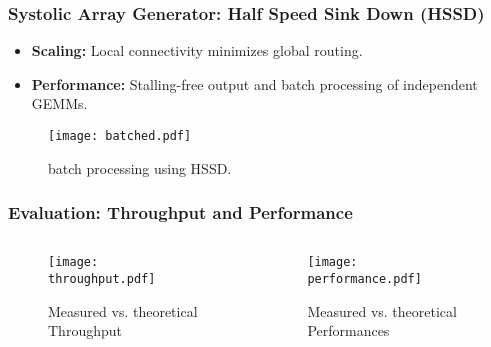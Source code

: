 \begin{frame}
	\frametitle{Systolic Array Generator: Half Speed Sink Down (HSSD)}

	    \begin{itemize}
                \item \textbf{Scaling:} Local connectivity minimizes global routing.
                \item \textbf{Performance:} Stalling-free output and batch processing of independent GEMMs.
            \end{itemize}
%
	    \begin{figure}[H]
            \centering
            \texttt{[image: batched.pdf]}
            \caption{batch processing using HSSD.}
            \label{fig:batched}
	    \end{figure}

\end{frame}

\begin{frame}
    \frametitle{Evaluation: Throughput and Performance}

    \begin{columns}
        \begin{column}{0.5\textwidth}
            \begin{figure}
                \centering
                \texttt{[image: throughput.pdf]}
		    \vspace{-0.3cm}
                \caption{Measured vs. theoretical Throughput}
            \end{figure}
        \end{column}

        \begin{column}{0.5\textwidth}
            \begin{figure}
                \centering
                \texttt{[image: performance.pdf]}
		    \vspace{-0.3cm}
                \caption{Measured vs. theoretical Performances}
            \end{figure}
        \end{column}
    \end{columns}

\end{frame}

